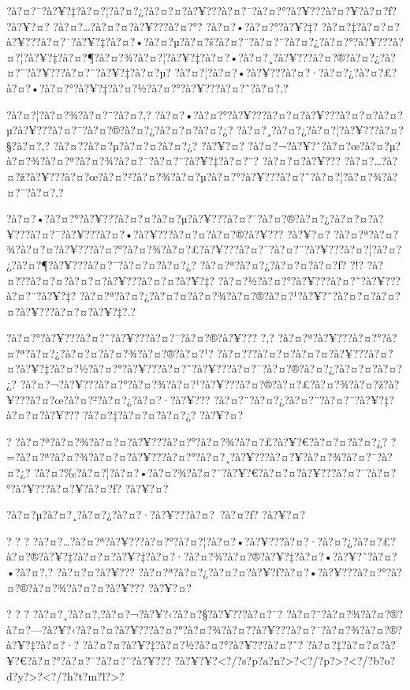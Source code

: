 \documentclass[11pt, openany]{book}
\begin{document}
{{{{{{{{{{{{{{{?à?¤?¯?à?¥?‡?à?¤?¦?à?¤?¿?à?¤?¤?à?¥???à?¤?¯?à?¤?°?à?¥???à?¤?¥?à?¤?ƒ?
?à?¥?¤? ?à?¤?\ldots{}?à?¤?¤?à?¥???à?¤?°? ?à?¤?•?à?¤?°?à?¥?‡?
?à?¤?‡?à?¤?¤?à?¥???à?¤?¯?à?¥?‡?à?¤?•?à?¤?µ?à?¤?š?à?¤?¨?à?¤?¨?à?¤?¿?à?¤?°?à?¥???à?¤?¦?à?¥?‡?à?¤?¶?à?¤?¾?à?¤?¦?à?¥?‡?à?¤?•?à?¤?¸?à?¥???à?¤?®?à?¤?¿?à?¤?¨?à?¥???à?¤?¨?à?¥?‡?à?¤?µ?
?à?¤?¦?à?¤?•?à?¥???à?¤?·?à?¤?¿?à?¤?£?à?¤?•?à?¤?°?à?¥?‡?à?¤?½?à?¤?°?à?¥???à?¤?˜?à?¤?‚?

?à?¤?¦?à?¤?¾?à?¤?¨?à?¤?‚?
?à?¤?•?à?¤?°?à?¥???à?¤?¤?à?¥???à?¤?¤?à?¤?µ?à?¥???à?¤?¯?à?¤?®?à?¤?¿?à?¤?¤?à?¤?¿?
?à?¤?¸?à?¤?¿?à?¤?¦?à?¥???à?¤?§?à?¤?‚? ?à?¤?­?à?¤?µ?à?¤?¤?à?¤?¿? ?à?¥?¤?
?à?¤?¬?à?¥?ˆ?à?¤?œ?à?¤?µ?à?¤?¾?à?¤?ª?à?¤?¾?à?¤?¯?à?¤?¨?à?¥?‡?à?¤?¨?
?à?¤?¤?à?¥???
?à?¤?\ldots{}?à?¤?ž?à?¥???à?¤?œ?à?¤?²?à?¤?¾?à?¤?µ?à?¤?°?à?¥???à?¤?˜?à?¤?¦?à?¤?¾?à?¤?¨?à?¤?‚?

?à?¤?•?à?¤?°?à?¥???à?¤?¤?à?¤?µ?à?¥???à?¤?¯?à?¤?®?à?¤?¿?à?¤?¤?à?¥???à?¤?¯?à?¥???à?¤?•?à?¥???à?¤?¤?à?¤?®?à?¥???
?à?¥?¤?
?à?¤?ª?à?¤?¾?à?¤?¤?à?¥???à?¤?°?à?¤?¾?à?¤?£?à?¥???à?¤?¯?à?¤?¨?à?¥???à?¤?¦?à?¤?¿?à?¤?¶?à?¥???à?¤?¯?à?¤?¤?à?¤?¿?
?à?¤?ª?à?¤?¿?à?¤?¤?à?¤?ƒ? ?!? ?à?¤???à?¤?¤?à?¤?¤?à?¥???à?¤?¤?à?¥?‡?
?à?¤?½?à?¤?°?à?¥???à?¤?˜?à?¥???à?¤?¯?à?¥?‡?
?à?¤?ª?à?¤?¿?à?¤?¤?à?¤?¾?à?¤?®?à?¤?¹?à?¥?ˆ?à?¤?¤?à?¤?¤?à?¥???à?¤?¤?à?¥?‡?.?

?à?¤?°?à?¥???à?¤?˜?à?¥???à?¤?¯?à?¤?®?à?¥??? ?,?
?à?¤?ª?à?¥???à?¤?°?à?¤?ª?à?¤?¿?à?¤?¤?à?¤?¾?à?¤?®?à?¤?¹?
?à?¤???à?¤?¤?à?¤?¤?à?¥???à?¤?¤?à?¥?‡?à?¤?½?à?¤?°?à?¥???à?¤?˜?à?¥???à?¤?¯?à?¤?®?à?¤?¿?à?¤?¤?à?¤?¿?
?à?¤?¬?à?¥???à?¤?°?à?¤?¾?à?¤?¹?à?¥???à?¤?®?à?¤?£?à?¤?¾?à?¤?ž?à?¥???à?¤?œ?à?¤?²?à?¤?¿?à?¤?·?à?¥???
?à?¤?¨?à?¤?¿?à?¤?¨?à?¤?¯?à?¥?‡?à?¤?¤?à?¥??? ?à?¤?‡?à?¤?¤?à?¤?¿? ?à?¥?¤?

? ?à?¤?ª?à?¤?¾?à?¤?¤?à?¥???à?¤?°?à?¤?¾?à?¤?£?à?¥?€?à?¤?¤?à?¤?¿?
?=?à?¤?ª?à?¤?¾?à?¤?¤?à?¥???à?¤?°?à?¤?¸?à?¥???à?¤?¥?à?¤?¾?à?¤?¨?à?¤?¿?
?à?¤?‰?à?¤?¦?à?¤?•?à?¤?¾?à?¤?¨?à?¥?€?à?¤?¤?à?¥???à?¤?¯?à?¤?°?à?¥???à?¤?¥?à?¤?ƒ?
?à?¥?¤?

?à?¤?µ?à?¤?¸?à?¤?¿?à?¤?·?à?¥???à?¤?~?à?¤?ƒ? ?à?¥?¤?

? ? ?
?à?¤?\ldots{}?à?¤?ª?à?¥???à?¤?°?à?¤?¦?à?¤?•?à?¥???à?¤?·?à?¤?¿?à?¤?£?à?¤?®?à?¥?‡?à?¤?¤?à?¥?‡?à?¤?·?à?¤?¾?à?¤?®?à?¥?‡?à?¤?•?à?¥?ˆ?à?¤?•?à?¤?‚?
?à?¤?¤?à?¥???
?à?¤?ª?à?¤?¿?à?¤?¤?à?¥?ƒ?à?¤?•?à?¥???à?¤?°?à?¤?®?à?¤?¾?à?¤?¤?à?¥???
?à?¥?¤?

? ? ? ?à?¤?¸?à?¤?‚?à?¤?¬?à?¥?‹?à?¤?§?à?¥???à?¤?¯?
?à?¤?¨?à?¤?¾?à?¤?®?à?¤?---?à?¥?‹?à?¤?¤?à?¥???à?¤?°?à?¤?¾?à?¤?­?à?¥???à?¤?¯?à?¤?¾?à?¤?®?à?¥?‡?à?¤?·?
?à?¤?¤?à?¥?‡?à?¤?½?à?¤?°?à?¥???à?¤?˜?
?à?¤?‡?à?¤?¤?à?¥?€?à?¤?°?à?¤?¯?à?¤?¨?à?¥???
?à?¥?¥?\textless{}?/?s?p?a?n?\textgreater{}?\textless{}?/?p?\textgreater{}?\textless{}?/?b?o?d?y?\textgreater{}?\textless{}?/?h?t?m?l?\textgreater{}?

}}}}}}}}}}}}}}}
\end{document}

